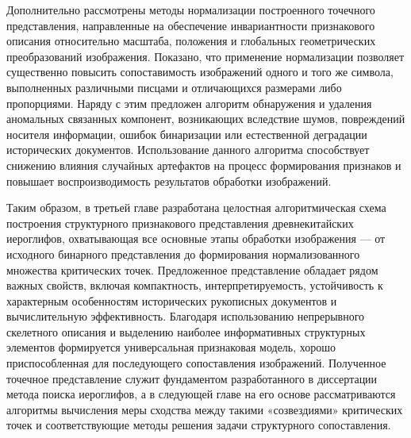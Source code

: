 Дополнительно рассмотрены методы нормализации построенного точечного представления, направленные на обеспечение инвариантности признакового описания относительно масштаба, положения и глобальных геометрических преобразований изображения. Показано, что применение нормализации позволяет существенно повысить сопоставимость изображений одного и того же символа, выполненных различными писцами и отличающихся размерами либо пропорциями. Наряду с этим предложен алгоритм обнаружения и удаления аномальных связанных компонент, возникающих вследствие шумов, повреждений носителя информации, ошибок бинаризации или естественной деградации исторических документов. Использование данного алгоритма способствует снижению влияния случайных артефактов на процесс формирования признаков и повышает воспроизводимость результатов обработки изображений.

Таким образом, в третьей главе разработана целостная алгоритмическая схема построения структурного признакового представления древнекитайских иероглифов, охватывающая все основные этапы обработки изображения — от исходного бинарного представления до формирования нормализованного множества критических точек. Предложенное представление обладает рядом важных свойств, включая компактность, интерпретируемость, устойчивость к характерным особенностям исторических рукописных документов и вычислительную эффективность. Благодаря использованию непрерывного скелетного описания и выделению наиболее информативных структурных элементов формируется универсальная признаковая модель, хорошо приспособленная для последующего сопоставления изображений. Полученное точечное представление служит фундаментом разработанного в диссертации метода поиска иероглифов, а в следующей главе на его основе рассматриваются алгоритмы вычисления меры сходства между такими «созвездиями» критических точек и соответствующие методы решения задачи структурного сопоставления.

\FloatBarrier
